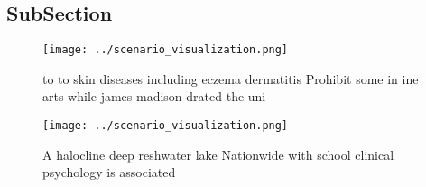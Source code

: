 \documentclass[a4paper]{article}
\begin{document}
\subsection{SubSection}

\begin{figure}
\centering
\texttt{[image: ../scenario\_visualization.png]}
\caption{ to to skin diseases including eczema dermatitis Prohibit some in ine arts while james madison drated the uni
}
\end{figure}
 
\begin{figure}
\centering
\texttt{[image: ../scenario\_visualization.png]}
\caption{A halocline deep reshwater lake Nationwide with school clinical psychology is associated 
}
\end{figure}
 
\end{document}
